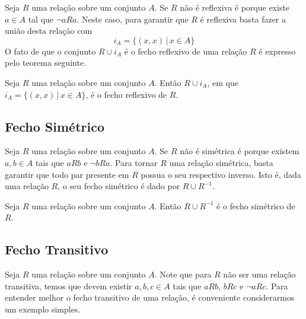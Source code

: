 Seja $R$ uma relação sobre um conjunto $A$. Se $R$ não é reflexiva é
porque existe $a \in A$ tal que $\neg aRa$. Neste caso, para garantir
que $R$ é reflexiva basta fazer a união desta relação com
\[
i_A =\{(x,x)\,|\,x\in A\}
\]
O fato de que o conjunto $R \cup i_A$ é o fecho reflexivo de uma
relação $R$ é expresso pelo teorema seguinte.

\begin{Theorem}\label{fecho1}
Seja $R$ uma relação sobre um conjunto $A$. Então $R \cup i_{A}$, em
que $i_A=\{(x,x)\,|\,x\in A\}$, é o fecho reflexivo de $R$.
\end{Theorem}

\subsection{Fecho Simétrico}

Seja $R$ uma relação sobre um conjunto $A$. Se $R$ não é simétrica é
porque existem $a,b\in A$ tais que $aRb$ e $\neg bRa$. Para tornar
$R$ uma relação simétrica, basta garantir que todo par presente em $R$
possua o seu respectivo inverso. Isto é, dada uma relação $R$, o seu
fecho simétrico é dado por $R \cup R^{-1}$.

\begin{Theorem}\label{fecho2}
Seja $R$ uma relação sobre um conjunto $A$. Então $R \cup R^{-1}$
é o fecho simétrico de $R$.
\end{Theorem}

\subsection{Fecho Transitivo}

Seja $R$ uma relação sobre um conjunto $A$. Note que para $R$ não ser
uma relação transitiva, temos que devem existir $a,b,c\in A$ tais que
$aRb$, $bRc$ e $\neg aRc$. Para entender melhor o fecho transitivo de
uma relação, é conveniente considerarmos um exemplo simples.

